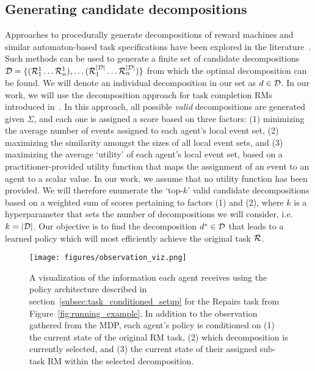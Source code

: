 \subsection{Generating candidate decompositions}
\label{subsec:generating_decompositions}
Approaches to procedurally generate decompositions of reward machines and similar automaton-based task specifications have been explored in the literature~\cite{smith2023automatic, lauffer2022dfadecomp}. Such methods can be used to generate a finite set of candidate decompositions $\mathcal{D} = \{(\mathcal{R}_{1}^1 \dots \mathcal{R}_{n}^1), \dots \\(\mathcal{R}_{1}^{|\mathcal{D}|} \dots \mathcal{R}_{n}^{|\mathcal{D}|})\}$ from which the optimal decomposition can be found. We will denote an individual decomposition in our set as $d \in \mathcal{D}$. In our work, we will use the decomposition approach for task completion RMs introduced in~\cite{smith2023automatic}. In this approach, all possible \textit{valid} decompositions are generated given $\Sigma$, and each one is assigned a score based on three factors: (1) minimizing the average number of events assigned to each agent's local event set, (2) maximizing the similarity amongst the sizes of all local event sets, and (3) maximizing the average `utility' of each agent's local event set, based on a practitioner-provided utility function that maps the assignment of an event to an agent to a scalar value. In our work, we assume that no utility function has been provided. We will therefore enumerate the `top-$k$' valid candidate decompositions based on a weighted sum of scores pertaining to factors (1) and (2), where $k$ is a hyperparameter that sets the number of decompositions we will consider, i.e. $k = |\mathcal{D}|$. Our objective is to find the decomposition $d^* \in \mathcal{D}$ that leads to a learned policy which will most efficiently achieve the original task $\mathcal{R}$.



\begin{figure*}[t]
\centering
\texttt{[image: figures/observation\_viz.png]}
\caption{A visualization of the information each agent receives using the policy architecture described in section~\ref{subsec:task_conditioned_setup} for the Repairs task from Figure~\ref{fig:running_example}. In addition to the observation gathered from the MDP, each agent's policy is conditioned on (1) the current state of the original RM task, (2) which decomposition is currently selected, and (3) the current state of their assigned sub-task RM within the selected decomposition.
}
\label{fig:observation_viz}
\end{figure*} 


